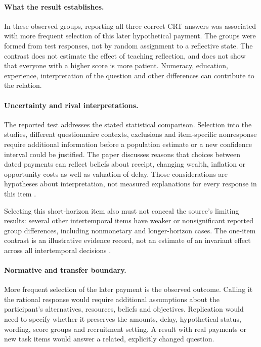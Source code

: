 \paragraph{What the result establishes.}
In these observed groups, reporting all three correct CRT answers was associated
with more frequent selection of this later hypothetical payment. The groups
were formed from test responses, not by random assignment to a reflective
state. The contrast does not estimate the effect of teaching reflection, and
does not show that everyone with a higher score is more patient. Numeracy,
education, experience, interpretation of the question and other differences
can contribute to the relation.

\paragraph{Uncertainty and rival interpretations.}
The reported test addresses the stated statistical comparison. Selection into
the studies, different questionnaire contexts, exclusions and item-specific
nonresponse require additional information before a population estimate or a
new confidence interval could be justified. The paper discusses reasons that
choices between dated payments can reflect beliefs about receipt, changing
wealth, inflation or opportunity costs as well as valuation of delay. Those
considerations are hypotheses about interpretation, not measured explanations
for every response in this item \cite[pp.~31--32]{Frederick2005CRT}.

Selecting this short-horizon item also must not conceal the source's limiting
results: several other intertemporal items have weaker or nonsignificant
reported group differences, including nonmonetary and longer-horizon cases.
The one-item contrast is an illustrative evidence record, not an estimate of
an invariant effect across all intertemporal decisions
\cite[table~2 and discussion, pp.~30--32]{Frederick2005CRT}.

\paragraph{Normative and transfer boundary.}
More frequent selection of the later payment is the observed outcome. Calling
it the rational response would require additional assumptions about the
participant's alternatives, resources, beliefs and objectives. Replication
would need to specify whether it preserves the amounts, delay, hypothetical
status, wording, score groups and recruitment setting. A result with real
payments or new task items would answer a related, explicitly changed question.

